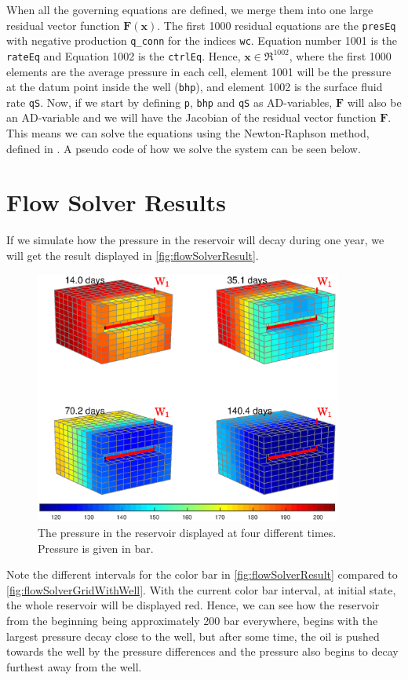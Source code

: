 When all the governing equations are defined, we merge them into one large residual vector function $\boldsymbol{F}(\boldsymbol{x})$. The first 1000 residual equations are the \texttt{presEq} with negative production \texttt{q\_conn} for the indices \texttt{wc}. Equation number 1001 is the \texttt{rateEq} and Equation 1002 is the \texttt{ctrlEq}. Hence, $\boldsymbol{x}\in\Re^{1002}$, where the first 1000 elements are the average pressure in each cell, element 1001 will be the pressure at the datum point inside the well (\texttt{bhp}), and element 1002 is the surface fluid rate \texttt{qS}. Now, if we start by defining \texttt{p}, \texttt{bhp} and \texttt{qS} as AD-variables, $\boldsymbol{F}$ will also be an AD-variable and we will have the Jacobian of the residual vector function $\boldsymbol{F}$. This means we can solve the equations using the Newton-Raphson method, defined in . A pseudo code of how we solve the system can be seen below.
\newpage


\section{Flow Solver Results}
If we simulate how the pressure in the reservoir will decay during one year, we will get the result displayed in \autoref{fig:flowSolverResult}.
\begin{figure}[H]
    \centering
    \includegraphics[width = 0.9\textwidth]{figures/flowSolver_result.eps}
    \caption{The pressure in the reservoir displayed at four different times. Pressure is given in bar.}
    \label{fig:flowSolverResult}
\end{figure}
Note the different intervals for the color bar in \autoref{fig:flowSolverResult} compared to \autoref{fig:flowSolverGridWithWell}. With the current color bar interval, at initial state, the whole reservoir will be displayed red. Hence, we can see how the reservoir from the beginning being approximately 200 bar everywhere, begins with the largest pressure decay close to the well, but after some time, the oil is pushed towards the well by the pressure differences and the pressure also begins to decay furthest away from the well. 

